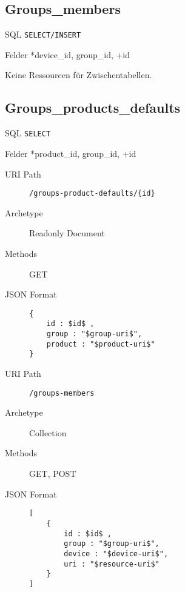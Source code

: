 \documentclass[10pt,a4paper]{scrartcl}
\begin{document}
\pagebreak
\subsection{Groups\_members}

\begin{description*}
	\item[SQL] \texttt{SELECT/INSERT}
	\item[Felder] *device\_id, group\_id, +id
\end{description*}

Keine Ressourcen für Zwischentabellen.

\pagebreak
\subsection{Groups\_products\_defaults}

\begin{description*}
	\item[SQL] \texttt{SELECT}
	\item[Felder] *product\_id, group\_id, +id
\end{description*}


\begin{mdframed}[style=def]
\begin{description}
	\item[URI Path] \texttt{/groups-product-defaults/\{id\}}
	\item[Archetype] Readonly Document
	\item[Methods] GET
	\item[JSON Format] \hfill
\begin{lstlisting}
{
	id : $id$ ,
	group : "$group-uri$",
	product : "$product-uri$"
}
\end{lstlisting}
\end{description}
\end{mdframed}

\begin{mdframed}[style=def]
\begin{description}
	\item[URI Path] \texttt{/groups-members}
	\item[Archetype] Collection
	\item[Methods] GET, POST
	\item[JSON Format] \hfill
\begin{lstlisting}
[
	{
		id : $id$ ,
		group : "$group-uri$",
		device : "$device-uri$",
		uri : "$resource-uri$"
	}
]
\end{lstlisting}
\end{description}
\end{mdframed}
\end{document}
